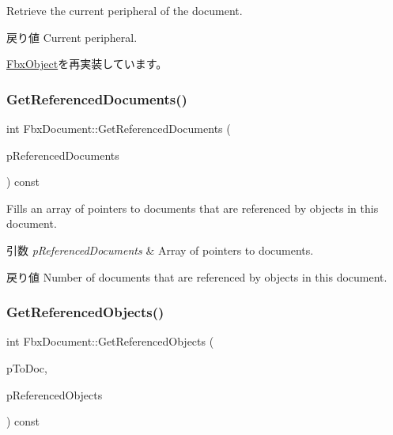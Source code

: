 Retrieve the current peripheral of the document. \begin{DoxyReturn}{戻り値}
Current peripheral. 
\end{DoxyReturn}


\hyperlink{class_fbx_object_a7aef9083f559702547871bedbf0d6b5a}{Fbx\+Object}を再実装しています。

\mbox{\label{class_fbx_document_a2aa5ab43264511b4f995aeec92e618fb}} 
\subsubsection{\texorpdfstring{Get\+Referenced\+Documents()}{GetReferencedDocuments()}}
{\footnotesize\ttfamily int Fbx\+Document\+::\+Get\+Referenced\+Documents (\begin{DoxyParamCaption}\item[{\hyperlink{class_fbx_array}{Fbx\+Array}$<$ \hyperlink{class_fbx_document}{Fbx\+Document} $\ast$$>$ \&}]{p\+Referenced\+Documents }\end{DoxyParamCaption}) const}

Fills an array of pointers to documents that are referenced by objects in this document.


\begin{DoxyParams}{引数}
{\em p\+Referenced\+Documents} & Array of pointers to documents. \\
\hline
\end{DoxyParams}
\begin{DoxyReturn}{戻り値}
Number of documents that are referenced by objects in this document. 
\end{DoxyReturn}
\mbox{\label{class_fbx_document_ab515ccdc174d34182eb04cfbd65709ee}} 
\subsubsection{\texorpdfstring{Get\+Referenced\+Objects()}{GetReferencedObjects()}}
{\footnotesize\ttfamily int Fbx\+Document\+::\+Get\+Referenced\+Objects (\begin{DoxyParamCaption}\item[{const \hyperlink{class_fbx_document}{Fbx\+Document} $\ast$}]{p\+To\+Doc,  }\item[{\hyperlink{class_fbx_array}{Fbx\+Array}$<$ \hyperlink{class_fbx_object}{Fbx\+Object} $\ast$$>$ \&}]{p\+Referenced\+Objects }\end{DoxyParamCaption}) const}

